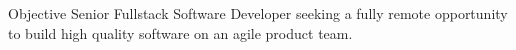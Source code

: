 \begin{section}{Objective}
  Senior Fullstack Software Developer seeking a fully remote opportunity to build high quality software on an agile product team.
\end{section}
